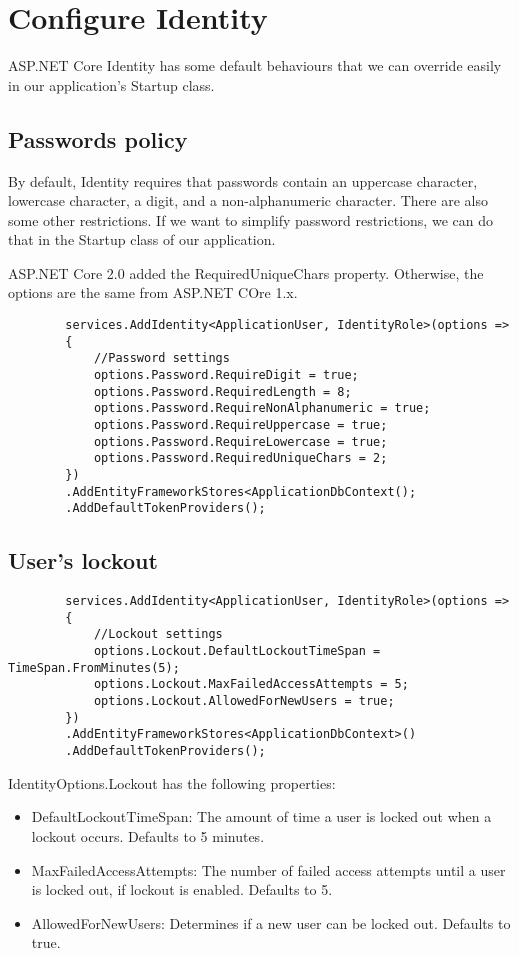 \documentclass{report}
\begin{document}
    \chapter{Configure Identity}
    ASP.NET Core Identity has some default behaviours that we can override easily in our application's Startup class.

    \section{Passwords policy}
    By default, Identity requires that passwords contain an uppercase character, lowercase character, a digit, and a non-alphanumeric character. There are also some other restrictions. If we want to simplify password restrictions, we can do that in the Startup class of our application.

    ASP.NET Core 2.0 added the RequiredUniqueChars property. Otherwise, the options are the same from ASP.NET COre 1.x.
    \lstset{style=sharpc}
    \begin{lstlisting}
        services.AddIdentity<ApplicationUser, IdentityRole>(options =>
        {
            //Password settings
            options.Password.RequireDigit = true;
            options.Password.RequiredLength = 8;
            options.Password.RequireNonAlphanumeric = true;
            options.Password.RequireUppercase = true;
            options.Password.RequireLowercase = true;
            options.Password.RequiredUniqueChars = 2;
        })
        .AddEntityFrameworkStores<ApplicationDbContext();
        .AddDefaultTokenProviders();
    \end{lstlisting}

    \section{User's lockout}
    \lstset{style=sharpc}
    \begin{lstlisting}
        services.AddIdentity<ApplicationUser, IdentityRole>(options =>
        {
            //Lockout settings
            options.Lockout.DefaultLockoutTimeSpan = TimeSpan.FromMinutes(5);
            options.Lockout.MaxFailedAccessAttempts = 5;
            options.Lockout.AllowedForNewUsers = true;
        })
        .AddEntityFrameworkStores<ApplicationDbContext>()
        .AddDefaultTokenProviders();
    \end{lstlisting}

    IdentityOptions.Lockout has the following properties:
    \begin{itemize}
        \item DefaultLockoutTimeSpan: The amount of time a user is locked
        out when a lockout occurs. Defaults to 5 minutes.
        \item MaxFailedAccessAttempts: The number of failed access attempts
        until a user is locked out, if lockout is enabled. Defaults to 5.
        \item AllowedForNewUsers: Determines if a new user can be locked out.
        Defaults to true.
    \end{itemize}
\end{document}
